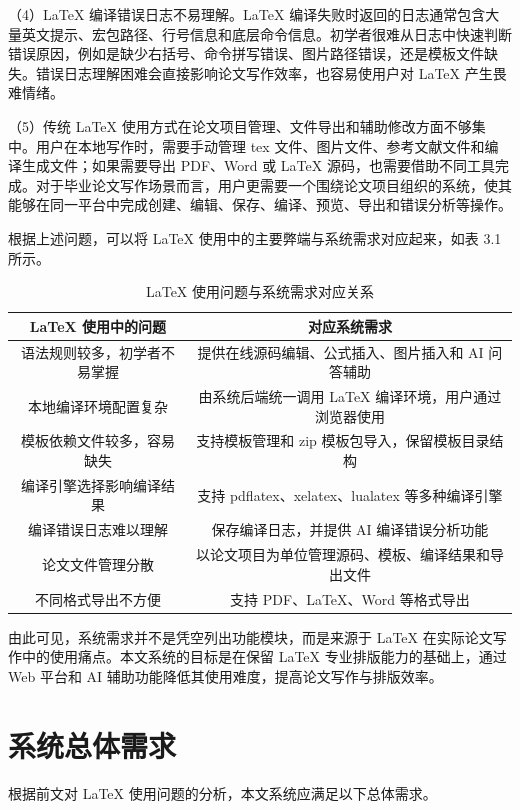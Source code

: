 \documentclass{xduugthesis}
\begin{document}
（4）LaTeX 编译错误日志不易理解。LaTeX 编译失败时返回的日志通常包含大量英文提示、宏包路径、行号信息和底层命令信息。初学者很难从日志中快速判断错误原因，例如是缺少右括号、命令拼写错误、图片路径错误，还是模板文件缺失。错误日志理解困难会直接影响论文写作效率，也容易使用户对 LaTeX 产生畏难情绪。

（5）传统 LaTeX 使用方式在论文项目管理、文件导出和辅助修改方面不够集中。用户在本地写作时，需要手动管理 tex 文件、图片文件、参考文献文件和编译生成文件；如果需要导出 PDF、Word 或 LaTeX 源码，也需要借助不同工具完成。对于毕业论文写作场景而言，用户更需要一个围绕论文项目组织的系统，使其能够在同一平台中完成创建、编辑、保存、编译、预览、导出和错误分析等操作。

根据上述问题，可以将 LaTeX 使用中的主要弊端与系统需求对应起来，如表 3.1 所示。

\begin{table}[!ht]
    \centering
    \caption{LaTeX 使用问题与系统需求对应关系}
    \label{tab:latex-problem-requirement}
    \begin{tabular}{|c|c|}
        \hline
        LaTeX 使用中的问题 & 对应系统需求 \\
        \hline
        语法规则较多，初学者不易掌握 & 提供在线源码编辑、公式插入、图片插入和 AI 问答辅助 \\
        \hline
        本地编译环境配置复杂 & 由系统后端统一调用 LaTeX 编译环境，用户通过浏览器使用 \\
        \hline
        模板依赖文件较多，容易缺失 & 支持模板管理和 zip 模板包导入，保留模板目录结构 \\
        \hline
        编译引擎选择影响编译结果 & 支持 pdflatex、xelatex、lualatex 等多种编译引擎 \\
        \hline
        编译错误日志难以理解 & 保存编译日志，并提供 AI 编译错误分析功能 \\
        \hline
        论文文件管理分散 & 以论文项目为单位管理源码、模板、编译结果和导出文件 \\
        \hline
        不同格式导出不方便 & 支持 PDF、LaTeX、Word 等格式导出 \\
        \hline
    \end{tabular}
\end{table}

由此可见，系统需求并不是凭空列出功能模块，而是来源于 LaTeX 在实际论文写作中的使用痛点。本文系统的目标是在保留 LaTeX 专业排版能力的基础上，通过 Web 平台和 AI 辅助功能降低其使用难度，提高论文写作与排版效率。

\section{系统总体需求}
根据前文对 LaTeX 使用问题的分析，本文系统应满足以下总体需求。
\end{document}
